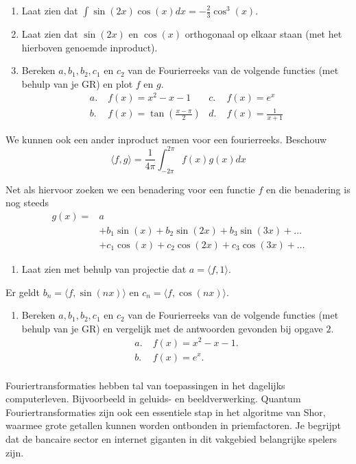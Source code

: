 \documentclass[../../main.tex]{subfiles}
\begin{document}
\begin{opdrachtlang}
\begin{enumerate}
    \item Laat zien dat $\int \sin(2x)\cos(x) dx=-\frac{2}{3}\cos^3(x)$.\\
    \item Laat zien dat $\sin(2x)$ en $\cos(x)$ orthogonaal op elkaar staan (met het hierboven genoemde inproduct).
    \item Bereken $a, b_1,b_2,c_1$ en $c_2$ van de Fourierreeks van de volgende functies (met behulp van je GR) en plot $f$ en $g$. \begin{align*}
        a.\;& f(x)=x^2-x-1
        & c.\;& f(x)=e^{x}\\
        b.\;& f(x)=\tan(\frac{x-\pi}{2})
        & d.\;& f(x)=\frac{1}{x+1}
    \end{align*}
\end{enumerate}

We kunnen ook een ander inproduct nemen voor een fourierreeks. Beschouw \[\langle f,g\rangle=\frac{1}{4\pi}\int_{-2\pi}^{2\pi} f(x)g(x)dx\]

Net als hiervoor zoeken we een benadering voor een functie $f$ en die benadering is nog steeds
    \begin{align*}
        g(x)=&a\\
        &+b_1\sin(x)+b_2\sin(2x)+b_3\sin(3x)+\ldots\\
        &+c_1\cos(x)+c_2\cos(2x)+c_3\cos(3x)+\ldots
    \end{align*}
\begin{enumerate}[resume]
\item Laat zien met behulp van projectie dat $a=\langle f,1\rangle$.
\end{enumerate}

Er geldt $b_n=\langle f,\sin(nx)\rangle$ en $c_n=\langle f,\cos(nx)\rangle$. 
\begin{enumerate}[resume]
\item Bereken $a, b_1,b_2,c_1$ en $c_2$ van de Fourierreeks van de volgende functies (met behulp van je GR) en vergelijk met de antwoorden gevonden bij opgave $2$.
   \begin{align*}
a.\;& f(x)=x^2-x-1.\\
b.\;& f(x)=e^x.\\
    \end{align*}
    
\end{enumerate}
\end{opdrachtlang}
Fouriertransformaties hebben tal van toepassingen in het dagelijks computerleven. Bijvoorbeeld in geluids- en beeldverwerking. Quantum Fouriertransformaties zijn ook een essentiele stap in het algoritme van Shor, waarmee grote getallen kunnen worden ontbonden in priemfactoren. Je begrijpt dat de bancaire sector en internet giganten in dit vakgebied belangrijke spelers zijn.
\end{document}
